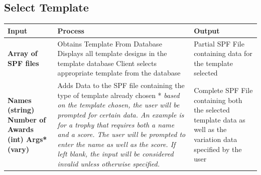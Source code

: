 \documentclass[oneside,openany,11pt,a4paper]{report}
\begin{document}
\subsection{Select Template}
\begin{longtable}{|p{3cm}|p{5cm}|p{4cm}|}	
	\hline
	\rowcolor{gray!40}
	\textbf{Input} & \textbf{Process}  & \textbf{Output} \\ \hline
	
	\rowcolor{white}
	\textbf{Array of SPF files} &  
	Obtains Template From Database \newline
	Displays all template designs in the template database \newline
	Client selects appropriate template from the database
	 &  Partial SPF File containing data for the template selected \\ \hline
	
	\rowcolor{gray!25}
	\noindent \textbf{
		Names (string) \newline
		Number of Awards (int) \newline
		Args*(vary)
	} &  Adds Data to the SPF file containing the type of template already chosen \newline
* \textit{based on the template chosen, the user will be prompted for certain data. An example is for a trophy that requires both a name and a score. The user will be prompted to enter the name as well as the score. If left blank, the input will be considered invalid unless otherwise specified.}
 &  Complete SPF File containing both the selected template data as well as the variation data specified by the user \\ \hline
	
\end{longtable}
\end{document}
